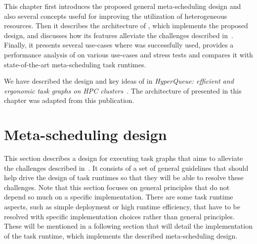 This chapter first introduces the proposed general meta-scheduling design and also several concepts
useful for improving the utilization of heterogeneous resources. Then it describes the architecture
of \hyperqueue{}, which implements the proposed design, and discusses how its features
alleviate the challenges described in~. Finally, it presents several
use-cases where \hyperqueue{} was successfully used, provides a performance analysis of
\hyperqueue{} on various use-cases and stress tests and compares it with state-of-the-art
meta-scheduling task runtimes.

We have described the design and key ideas of \hyperqueue{} in
\emph{HyperQueue: efficient and ergonomic task graphs on HPC clusters}~\cite{hyperqueue}. The architecture of \hyperqueue{}
presented in this chapter was adapted from this publication.


\section{Meta-scheduling design}
This section describes a design for executing task graphs that aims to alleviate the challenges
described in~. It consists of a set of general guidelines that should help
drive the design of task runtimes so that they will be able to resolve these challenges. Note that
this section focuses on general principles that do not depend so much on a specific implementation.
There are some task runtime aspects, such as simple deployment or high runtime efficiency, that
have to be resolved with specific implementation choices rather than general principles. These will
be mentioned in a following section that will detail the implementation of the
\hyperqueue{} task runtime, which implements the described meta-scheduling design.

